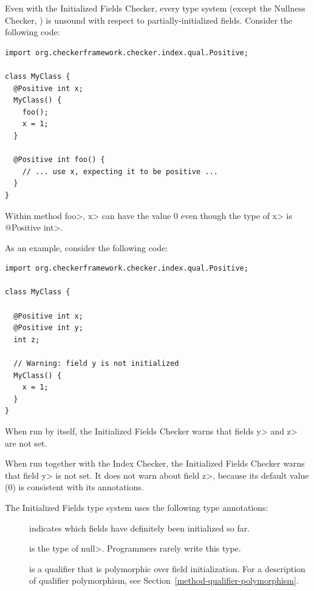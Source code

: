 
Even with the Initialized Fields Checker, every type system (except the
Nullness Checker, ) is unsound with
respect to partially-initialized fields.  Consider the following code:

\begin{Verbatim}
import org.checkerframework.checker.index.qual.Positive;

class MyClass {
  @Positive int x;
  MyClass() {
    foo();
    x = 1;
  }

  @Positive int foo() {
    // ... use x, expecting it to be positive ...
  }
}
\end{Verbatim}

\noindent
Within method \<foo>, \<x> can have the value 0 even though the type of
\<x> is \<@Positive int>.



As an example, consider the following code:

\begin{Verbatim}
import org.checkerframework.checker.index.qual.Positive;

class MyClass {

  @Positive int x;
  @Positive int y;
  int z;

  // Warning: field y is not initialized
  MyClass() {
    x = 1;
  }
}
\end{Verbatim}

When run by itself, the Initialized Fields Checker warns that fields \<y>
and \<z> are not set.

When run together with the Index Checker, the Initialized Fields Checker
warns that field \<y> is not set.  It does not warn about field \<z>,
because its default value (0) is consistent with its annotations.



The Initialized Fields type system uses the following type annotations:
\begin{description}
\item[]
  indicates which fields have definitely been initialized so far.
\item[]
  is the type of \<null>.  Programmers rarely write this type.
\item[]
  is a qualifier that is polymorphic over field initialization.
  For a description of qualifier polymorphism, see
  Section~\ref{method-qualifier-polymorphism}.
\end{description}

